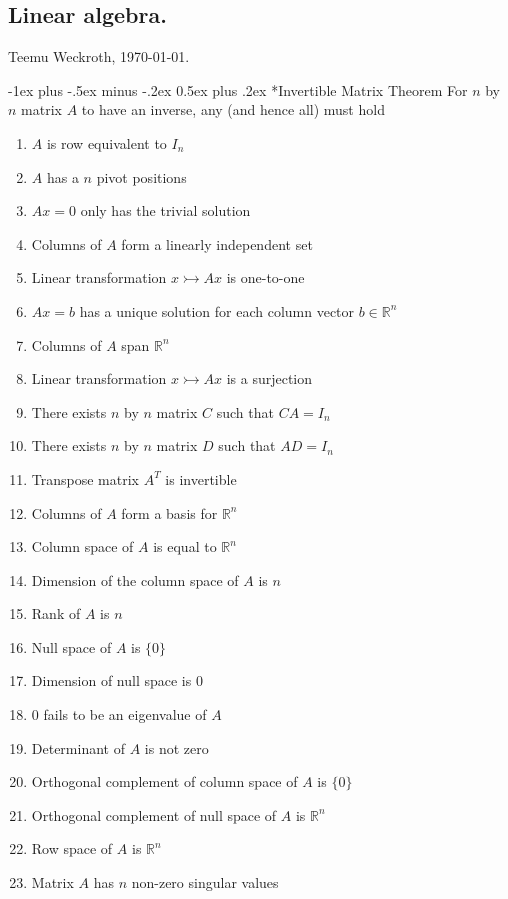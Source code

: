 \documentclass[10pt,landscape,a4paper]{article}
\makeatletter
\renewcommand{\section}{\@startsection{section}{1}{0mm}%
	{-1ex plus -.5ex minus -.2ex}%
	{0.5ex plus .2ex}%
	{\normalfont\large\bfseries}}
\makeatother
\begin{document}
\raggedright
\footnotesize
\begin{multicols}{3}
	
	
	\setlength{\premulticols}{1pt}
	\setlength{\postmulticols}{1pt}
	\setlength{\multicolsep}{1pt}
	\setlength{\columnsep}{2pt}
	
	\part*{Linear algebra.}
	\begin{center}
		Teemu Weckroth, \today.
	\end{center}
	
	\section*{Invertible Matrix Theorem}
	For $n$ by $n$ matrix $A$ to have an inverse, any (and hence all) must hold
	\begin{enumerate}
		\item $A$ is row equivalent to $I_n$
		\item $A$ has a $n$ pivot positions
		\item $Ax = 0$ only has the trivial solution
		\item Columns of $A$ form a linearly independent set
		\item Linear transformation $x \rightarrowtail Ax$ is one-to-one
		\item $Ax = b$ has a unique solution for each column vector $b \in \mathbb{R}^n$
		\item Columns of $A$ span $\mathbb{R}^n$
		\item Linear transformation $x \rightarrowtail Ax$ is a surjection
		\item There exists $n$ by $n$ matrix $C$ such that $CA = I_n$
		\item There exists $n$ by $n$ matrix $D$ such that $AD = I_n$
		\item Transpose matrix $A^T$ is invertible
		\item Columns of $A$ form a basis for $\mathbb{R}^n$
		\item Column space of $A$ is equal to $\mathbb{R}^n$
		\item Dimension of the column space of $A$ is $n$
		\item Rank of $A$ is $n$
		\item Null space of $A$ is $\{0\}$
		\item Dimension of null space is $0$
		\item $0$ fails to be an eigenvalue of $A$
		\item Determinant of $A$ is not zero
		\item Orthogonal complement of column space of $A$ is $\{0\}$
		\item Orthogonal complement of null space of $A$ is $\mathbb{R}^n$
		\item Row space of $A$ is $\mathbb{R}^n$
		\item Matrix $A$ has $n$ non-zero singular values
	\end{enumerate}
	

\end{multicols}
\end{document}
